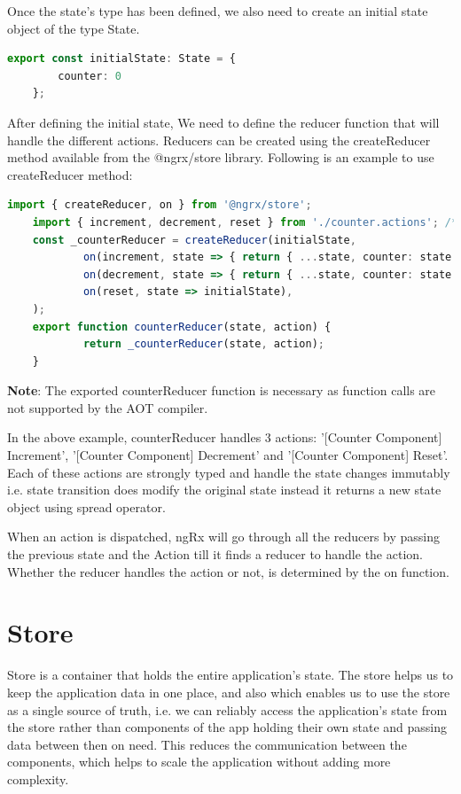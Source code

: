 \documentclass{report}
\begin{document}
Once the state's type has been defined, we also need to create an initial state object of the type State.

\begin{lstlisting}[caption=initial-state.ts, language=Typescript]
	export const initialState: State = {
		counter: 0
	};
\end{lstlisting}

After defining the initial state, We need to define the reducer function that will handle the different actions.
Reducers can be created using the createReducer method available from the @ngrx/store library. Following is an example to use createReducer method:

\begin{lstlisting}[caption=counter-reducer.ts, language=Typescript]
	import { createReducer, on } from '@ngrx/store';
	import { increment, decrement, reset } from './counter.actions'; /* This file contains all the actions */
	const _counterReducer = createReducer(initialState,
			on(increment, state => { return { ...state, counter: state.counter + 1 } }),
			on(decrement, state => { return { ...state, counter: state.counter - 1 } }),
			on(reset, state => initialState),
	);
	export function counterReducer(state, action) {
			return _counterReducer(state, action);
	}
\end{lstlisting}

\textbf{Note}: The exported counterReducer function is necessary as function calls are not supported by the AOT compiler.

In the above example, counterReducer handles 3 actions: '[Counter Component] Increment', '[Counter Component] Decrement' and '[Counter Component] Reset'. Each of these actions are strongly typed and handle the state changes immutably i.e. state transition does modify the original state instead it returns a new state object using spread operator. 

When an action is dispatched, ngRx will go through all the reducers by passing the previous state and the Action till it finds a reducer to handle the action. Whether the reducer handles the action or not, is determined by the on function.

\section{Store}
Store is a container that holds the entire application’s state.
\newline
The store helps us to keep the application data in one place, and also which enables us to use the store as a single source of truth, i.e. we can reliably access the application's state from the store rather than components of the app holding their own state and passing data between then on need. This reduces the communication between the components, which helps to scale the application without adding more complexity.
\end{document}
